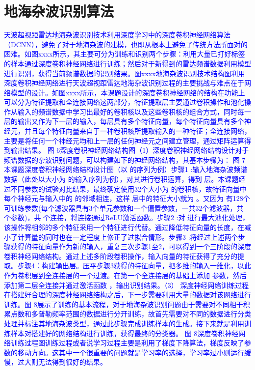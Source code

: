 \section{地海杂波识别算法}
\textcolor{blue}{天波超视距雷达地海杂波识别技术利用深度学习中的深度卷积神经网络算法（DCNN），避免了对于地海杂波的建模，也即从根本上避免了传统方法所面对的困难。如图xxxx所示，其主要可分为训练和识别两个步骤：利用大量已打好标签的样本通过深度卷积神经网络进行训练；然后对于新得到的雷达频谱数据利用模型进行识别，获得当前频谱数据的识别结果。图xxxx地海杂波识别技术结构图利用深度卷积神经网络进行天波超视距雷达地海杂波识别过程的主要挑战与难点在于网络模型的设计。如图xxxx所示，本课题设计的深度卷积神经网络的结构在功能上可以分为特征提取和全连接网络这两部分，特征提取层主要通过卷积操作和池化操作从输入的频谱数据中学习出最好的卷积核以及这些卷积核的组合方式，同时每一层的输出又作为下一层的输入，每层具有多个特征向量，每个特征向量具有多个神经元，并且每个特征向量来自于一种卷积核所提取输入的一种特征；全连接网络，主要是将任何一个神经元均和上一层的任何神经元之间建立管理，通过矩阵运算得到输出结果。 图 6深度卷积神经网络结构图（1）深度卷积神经网络结构设计对于频谱数据的杂波识别问题，可以构建如下的神经网络结构，其基本步骤为： 图 7本课题深度卷积神经网络结构设计图（以 的序列为例）步骤1 :输入地海杂波频谱数据（此处以大小为 的输入序列为例），对其进行卷积运算，得到 层。本课题经过不同参数的试验对比结果，最终确定使用32个大小为 的卷积核，故特征向量中每个神经元与输入中的 的邻域相连，这样 层中的特征大小就为 。又因为 有128个可训练参数(每个滤波器具有3个单元参数和一个偏置参数，一共32个滤波器，共 个参数)，共 个连接，将连接通过ReLU激活函数。步骤2 :对 进行最大池化处理，该操作将相邻的多个特征采用一个特征进行代替。通过降低特征向量的长度，在减小了计算量的同时也在一定程度上修正了过拟合情形。步骤3 :将经过上述两个步骤获得的特征向量作为新的输入，重复三次步骤1至2，可以得到一个三阶段的深度卷积神经网络结构。通过上述多阶段卷积操作，输入向量的特征获得了充分的提取。步骤4：构建输出层。压平步骤3获得的特征向量，把多维的输入一维化，以此作为卷积层到全连接层的一个过渡。在第一个全连接层的基础上添加 参数，然后添加第二层全连接并通过激活函数 ，输出识别结果。（3）	深度神经网络训练过程在搭建好合理的深度神经网络结构之后，下一步需要利用大量的数据对该网络进行训练。图 8展示了训练的基本流程，对于地海杂波识别问题由于需要对不同相干积累点数和多普勒频率范围的数据进行分开训练，故首先需要对不同的数据进行分类处理并标注其地海杂波类型，通过此步骤完成训练样本的生成。接下来就是利用训练样本对搭建好的网络结构进行训练，获得最终的分类器。 图 8深度卷积神经网络训练过程图训练过程或者说学习过程主要是利用了梯度下降算法，梯度反映了参数的移动方向。这其中一个很重要的问题就是学习率的选择，学习率过小则运行缓慢，过大则无法得到很好的结果。}

